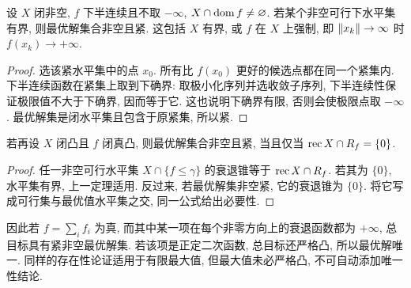 \begin{theorem}[最优解存在性]\label{thm:weierstrass}
设 $X$ 闭非空, $f$ 下半连续且不取 $-\infty$, $X\cap\operatorname{dom} f\ne\varnothing$. 若某个非空可行下水平集有界, 则最优解集合非空且紧. 这包括 $X$ 有界, 或 $f$ 在 $X$ 上强制, 即 $\lVert x_k\rVert\to\infty$ 时 $f(x_k)\to+\infty$.
\end{theorem}
\begin{proof}
选该紧水平集中的点 $x_0$. 所有比 $f(x_0)$ 更好的候选点都在同一个紧集内. 下半连续函数在紧集上取到下确界: 取极小化序列并选收敛子序列, 下半连续性保证极限值不大于下确界, 因而等于它. 这也说明下确界有限, 否则会使极限点取 $-\infty$. 最优解集是闭水平集且包含于原紧集, 所以紧.
\end{proof}
\begin{theorem}
若再设 $X$ 闭凸且 $f$ 闭真凸, 则最优解集合非空且紧, 当且仅当 $\operatorname{rec} X\cap R_f=\{0\}$.
\end{theorem}
\begin{proof}
任一非空可行水平集 $X\cap\{f\le\gamma\}$ 的衰退锥等于 $\operatorname{rec} X\cap R_f$. 若其为 $\{0\}$, 水平集有界, 上一定理适用. 反过来, 若最优解集非空紧, 它的衰退锥为 $\{0\}$. 将它写成可行集与最优值水平集之交, 同一公式给出必要性.
\end{proof}
因此若 $f=\sum_i f_i$ 为真, 而其中某一项在每个非零方向上的衰退函数都为 $+\infty$, 总目标具有紧非空最优解集. 若该项是正定二次函数, 总目标还严格凸, 所以最优解唯一. 同样的存在性论证适用于有限最大值, 但最大值未必严格凸, 不可自动添加唯一性结论.
